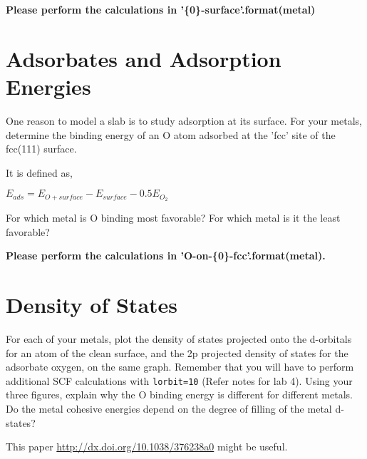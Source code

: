 \documentclass[11pt]{article}
\begin{document}
\textbf{Please perform the calculations in '\{0\}-surface'.format(metal)}

\section{Adsorbates and Adsorption Energies}
\label{sec:org142bd51}

One reason to model a slab is to study adsorption at its surface.  For your metals, determine the binding energy of an O atom adsorbed at the 'fcc' site of the fcc(111) surface. 

It is defined as,

\(E_{ads} = E_{O+surface} - E_{surface} - 0.5 E_{O_{2}}\)

For which metal is O binding most favorable? For which metal is it the least favorable?

\textbf{Please perform the calculations in 'O-on-\{0\}-fcc'.format(metal).}

\section{Density of States}
\label{sec:org3544ca9}
For each of your metals, plot the density of states projected onto the d-orbitals for an atom of the clean surface, and the 2p projected density of states for the adsorbate oxygen, on the same graph. Remember that you will have to perform additional SCF calculations with \texttt{lorbit=10} (Refer notes for lab 4). Using your three figures, explain why the O binding energy is different for different metals. Do the metal cohesive energies depend on the degree of filling of the metal d-states?

This paper \url{http://dx.doi.org/10.1038/376238a0} might be useful.
\end{document}
